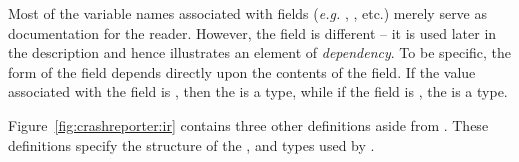 
Most of the variable names associated with fields ({\em e.g.}
, , etc.) merely serve as documentation for the reader.
However, the  field is different -- it is used later in the 
description and hence illustrates an element of {\em dependency}.  
To be specific, the form of the
 field depends directly upon the contents of the 
field.  If the value associated with the
 field is , then the  is
a  type, while if the  field is ,
the  is a  type.  

Figure~\ref{fig:crashreporter:ir} contains three other definitions
aside from .  These definitions specify the
structure of the  ,  and 
types used by .





